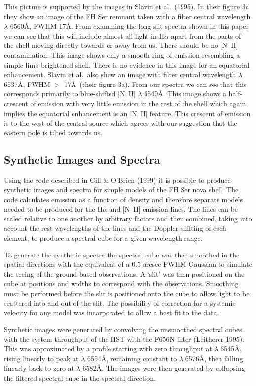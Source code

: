 This picture is supported by the images in 
Slavin et al.\ (1995). In their figure
3c they show an image of the FH Ser remnant taken with a filter central
wavelength $\lambda$ 6560\AA , FWHM 17\AA. From examining the long slit
spectra shown in this  paper 
we can see that this will include almost all light in
H$\alpha$ apart from the parts of the shell moving directly towards or
away from us. There should be no [N~II] contamination. This image shows
only a smooth ring of emission resembling a simple limb-brightened shell.
There is no evidence in this image for an equatorial enhancement. Slavin
et al.\ also show an image with filter central wavelength $\lambda$
6537\AA , FWHM $>$ 17\AA~(their figure 3a). From our spectra we can see
that this corresponds primarily to blue-shifted [N~II] $\lambda$ 6549\AA. This
image shows a half-crescent of emission with very little emission in the
rest of the shell which again implies the equatorial enhancement is an 
[N~II] feature. This crescent of emission is to the west of the central
source which agrees with our suggestion that the eastern pole is tilted
towards us.

\subsection{Synthetic Images and Spectra}

Using the code described in Gill \& O'Brien (1999) it is possible to
produce synthetic images and spectra for simple models of the FH Ser nova
shell. The code calculates emission as a function of density and
therefore separate models needed to be produced for the H$\alpha$ and [N~II]
emission lines. The lines can be scaled relative to one
another by arbitrary factors and then combined, taking into account the
rest wavelengths of the lines and the Doppler shifting of each element,
to produce a spectral cube for a given wavelength range.

To generate the synthetic spectra the spectral cube was then smoothed in
the spatial directions with the equivalent of a 0.5 arcsec FWHM Gaussian
to simulate the seeing of the ground-based observations. A `slit' was
then positioned on the cube at positions and widths to correspond with
the observations. Smoothing must be performed before the slit is
positioned onto the cube to allow light to be scattered into and out of
the slit. The possibility of correction for a systemic velocity for any
model was incorporated to allow a best fit to the data.

Synthetic images were generated by convolving the unsmoothed spectral
cubes with the system throughput of the HST with the F656N filter
(Leitherer 1995). This was approximated by a profile starting with zero
throughput at $\lambda$ 6545\AA, rising linearly to peak at
$\lambda$ 6554\AA, remaining constant to $\lambda$ 6576\AA, then falling
linearly back to zero at $\lambda$ 6582\AA. The images were then
generated by collapsing the filtered spectral cube in the spectral
direction.

